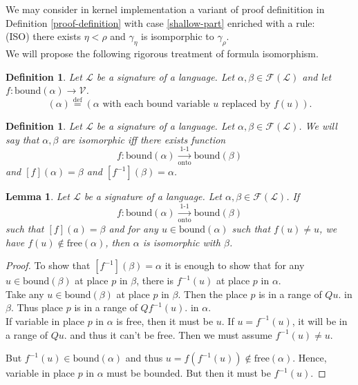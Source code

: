 \documentclass[10pt]{article}
\theoremstyle{plain}
\newtheorem{definition}[theorem]{Definition}
\newtheorem{lemma}[theorem]{Lemma}
\newcommand{\defeq}{\stackrel{\mathrm{def}}{=}}
\newcommand{\free}{\text{free}}
\newcommand{\bound}{\text{bound}}
\newcommand{\F}{\mathcal{F}}
\renewcommand{\L}{\mathscr{L}}
\newcommand{\V}{\mathscr{V}}
\begin{document}
We may consider in kernel implementation a variant of proof definitition in Definition \ref{proof-definition} with case \ref{shallow-part} enriched with a rule:
\\

(ISO) there exists $\eta < \rho$ and $\gamma_\eta$ is isomporphic to $
\gamma_\rho$.
\\

We will propose the following rigorous treatment of formula isomorphism.

\begin{definition}
Let $\L$ be a signature of a language.
Let $\alpha, \beta\in\F(\L)$ and let
$f:\bound(\alpha) \to \V$.
\begin{equation}
[f](\alpha) \defeq ( \alpha \text{ with each bound variable } u \text{ replaced by } f(u) ). 
\end{equation}
\end{definition}

\begin{definition}
\label{isomorphic-copy}
Let $\L$ be a signature of a language.
Let $\alpha, \beta\in\F(\L)$. We will say that $\alpha, \beta$ are isomorphic
iff there exists function 
$$f:\bound(\alpha) \xrightarrow[\text{onto}]{\text{1-1}} \bound(\beta)$$
and $[f](\alpha) = \beta$ and $[f^{-1}](\beta) = \alpha$. 
\end{definition}

\begin{lemma}
\label{fix-replacement}
Let $\L$ be a signature of a language.
Let $\alpha, \beta\in\F(\L)$. If
$$f:\bound(\alpha) \xrightarrow[\text{onto}]{\text{1-1}} \bound(\beta)$$
such that $[f](a)=\beta$ 
and for any $u\in\bound(\alpha)$ such that $f(u)\not=u$, we have $f(u)\not\in\free(\alpha)$,
then $\alpha$ is isomorphic with $\beta$.
\end{lemma}
\begin{proof}
To show that $[f^{-1}](\beta) = \alpha$ it is enough to show that for any $u\in\bound(\beta)$ at place $p$ in $\beta$, there is $f^{-1}(u)$ at place $p$ in $\alpha$.
\\

Take any $u\in\bound(\beta)$ at place $p$ in $\beta$. Then the place $p$ is in a range of $Qu.$ in $\beta$. Thus place $p$ is in a range of $Qf^{-1}(u).$ in $\alpha$. 
\\

If variable in place $p$ in $\alpha$ is free, then it must be $u$. 
If $u = f^{-1}(u)$, it will be in a range of $Qu.$ and thus it can't be free. 
Then we must assume $f^{-1}(u) \not= u$. 

But $f^{-1}(u)\in\bound(\alpha)$ and thus $u = f(f^{-1}(u))\not\in\free(\alpha)$. Hence, variable in place $p$ in $\alpha$ must be bounded. But then it must be $f^{-1}(u)$.

\end{proof}
\end{document}
